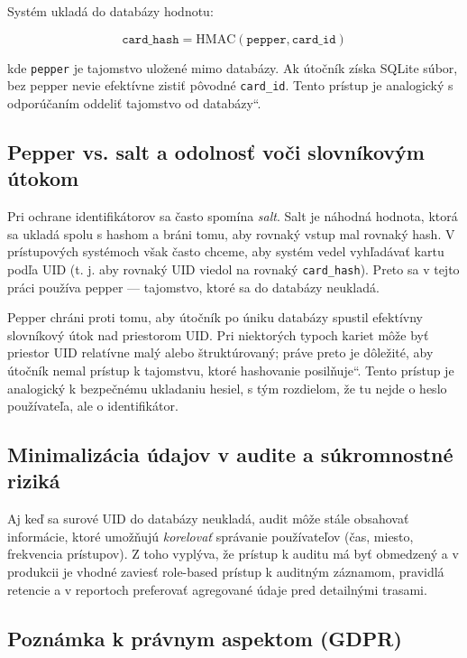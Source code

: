 \documentclass[journal,a4paper,onecolumn]{IEEEtran}
\newcommand{\uv}[1]{\quotedblbase#1\textquotedblleft}
\begin{document}
Systém ukladá do databázy hodnotu:

\begin{equation}
\texttt{card\_hash} = \mathrm{HMAC}(\texttt{pepper}, \texttt{card\_id})
\end{equation}

kde \texttt{pepper} je tajomstvo uložené mimo databázy. Ak útočník získa SQLite súbor, bez pepper nevie efektívne zistiť pôvodné \texttt{card\_id}. Tento prístup je analogický s odporúčaním \uv{oddeliť tajomstvo od databázy}.

\subsection{Pepper vs. salt a odolnosť voči slovníkovým útokom}

Pri ochrane identifikátorov sa často spomína \emph{salt}. Salt je náhodná hodnota, ktorá sa ukladá spolu s hashom a bráni tomu, aby rovnaký vstup mal rovnaký hash. V prístupových systémoch však často chceme, aby systém vedel vyhľadávať kartu podľa UID (t. j. aby rovnaký UID viedol na rovnaký \texttt{card\_hash}). Preto sa v tejto práci používa pepper — tajomstvo, ktoré sa do databázy neukladá.

Pepper chráni proti tomu, aby útočník po úniku databázy spustil efektívny slovníkový útok nad priestorom UID. Pri niektorých typoch kariet môže byť priestor UID relatívne malý alebo štruktúrovaný; práve preto je dôležité, aby útočník nemal prístup k tajomstvu, ktoré hashovanie \uv{posilňuje}. Tento prístup je analogický k bezpečnému ukladaniu hesiel, s tým rozdielom, že tu nejde o heslo používateľa, ale o identifikátor.

\subsection{Minimalizácia údajov v audite a súkromnostné riziká}

Aj keď sa surové UID do databázy neukladá, audit môže stále obsahovať informácie, ktoré umožňujú \emph{korelovať} správanie používateľov (čas, miesto, frekvencia prístupov). Z toho vyplýva, že prístup k auditu má byť obmedzený a v produkcii je vhodné zaviesť role-based prístup k auditným záznamom, pravidlá retencie a v reportoch preferovať agregované údaje pred detailnými trasami.

\subsection{Poznámka k právnym aspektom (GDPR)}
\end{document}

